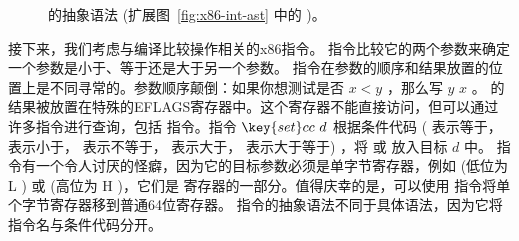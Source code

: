\documentclass[11pt]{book}
\newcommand{\gray}[1]{{\color{gray} #1}}
\begin{document}
\begin{figure}[tp]
\fbox{
\begin{minipage}{0.98\textwidth}
\small    
\[
\begin{array}{lcl}
\itm{bytereg} &::=& \key{ah} \mid \key{al} \mid \key{bh} \mid \key{bl}
    \mid \key{ch} \mid \key{cl} \mid \key{dh} \mid \key{dl} \\
\Arg &::=&  \gray{\IMM{\Int} \mid \REG{\Reg} \mid \DEREF{\Reg}{\Int}} 
     \mid \BYTEREG{\itm{bytereg}} \\
\itm{cc} & ::= & \key{e} \mid \key{l} \mid \key{le} \mid \key{g} \mid \key{ge} \\
\Instr &::=& \gray{ \BININSTR{\code{addq}}{\Arg}{\Arg} 
       \mid \BININSTR{\code{subq}}{\Arg}{\Arg} } \\
       &\mid& \gray{ \BININSTR{\code{'movq}}{\Arg}{\Arg} 
       \mid \UNIINSTR{\code{negq}}{\Arg} } \\
       &\mid& \gray{ \CALLQ{\itm{label}}{\itm{int}} \mid \RETQ{} 
       \mid \PUSHQ{\Arg} \mid \POPQ{\Arg} \mid \JMP{\itm{label}} } \\
       &\mid& \BININSTR{\code{xorq}}{\Arg}{\Arg}
       \mid \BININSTR{\code{cmpq}}{\Arg}{\Arg}\\
       &\mid& \BININSTR{\code{set}}{\itm{cc}}{\Arg} 
       \mid \BININSTR{\code{movzbq}}{\Arg}{\Arg}\\
       &\mid&  \JMPIF{\itm{cc}}{\itm{label}} \\
\Block &::= & \gray{\BLOCK{\itm{info}}{\LP\Instr\ldots\RP}} \\
\LangXIf{} &::= & \gray{\XPROGRAM{\itm{info}}{\LP\LP\itm{label} \,\key{.}\, \Block \RP\ldots\RP}}
\end{array}
\]
\end{minipage}
}
\caption{ \LangXIf{} 的抽象语法 (扩展图~\ref{fig:x86-int-ast} 中的 \LangXInt{} )。}
\label{fig:x86-1}
\end{figure}

接下来，我们考虑与编译比较操作相关的x86指令。  指令比较它的两个参数来确定一个参数是小于、等于还是大于另一个参数。  指令在参数的顺序和结果放置的位置上是不同寻常的。参数顺序颠倒：如果你想测试是否
$x < y$ ，那么写  $y$\code{,} $x$ 。
 的结果被放置在特殊的EFLAGS寄存器中。这个寄存器不能直接访问，但可以通过许多指令进行查询，包括  指令。指令
$\key{set}cc~d$ 根据条件代码  ( 表示等于，  表示小于， 
表示不等于，  表示大于，  表示大于等于) ，将  或  放入目标 $d$ 中。  指令有一个令人讨厌的怪癖，因为它的目标参数必须是单字节寄存器，例如
 (低位为 L ) 或  (高位为 H )，它们是  寄存器的一部分。值得庆幸的是，可以使用 
指令将单个字节寄存器移到普通64位寄存器。 
指令的抽象语法不同于具体语法，因为它将指令名与条件代码分开。
\end{document}
